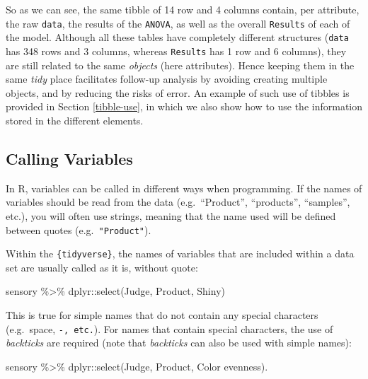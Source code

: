 \documentclass[
]{krantz}
\makeatletter
\newenvironment{Shaded}{\begin{snugshade}}{\end{snugshade}}
\newcommand{\AttributeTok}[1]{\textcolor[rgb]{0.61,0.61,0.61}{#1}}
\newcommand{\FunctionTok}[1]{\textcolor[rgb]{0,0,0}{#1}}
\newcommand{\NormalTok}[1]{#1}
\newcommand{\SpecialCharTok}[1]{\textcolor[rgb]{0,0,0}{#1}}
\newcommand{\StringTok}[1]{\textcolor[rgb]{0.5,0.5,0.5}{#1}}
\newenvironment{kframe}{%
\medskip{}
\setlength{\fboxsep}{.8em}
 \def\at@end@of@kframe{}%
 \ifinner\ifhmode%
  \def\at@end@of@kframe{\end{minipage}}%
  \begin{minipage}{\columnwidth}%
 \fi\fi%
 \def\FrameCommand##1{\hskip\@totalleftmargin \hskip-\fboxsep
 \colorbox{shadecolor}{##1}\hskip-\fboxsep
     \hskip-\linewidth \hskip-\@totalleftmargin \hskip\columnwidth}%
 \MakeFramed {\advance\hsize-\width
   \@totalleftmargin\z@ \linewidth\hsize
   \@setminipage}}%
 {\par\unskip\endMakeFramed%
 \at@end@of@kframe}
\renewenvironment{Shaded}{\begin{kframe}}{\end{kframe}}
\makeatother
\begin{document}
So as we can see, the same tibble of 14 row and 4 columns contain, per attribute, the raw \texttt{data}, the results of the \texttt{ANOVA}, as well as the overall \texttt{Results} of each of the model. Although all these tables have completely different structures (\texttt{data} has 348 rows and 3 columns, whereas \texttt{Results} has 1 row and 6 columns), they are still related to the same \emph{objects} (here attributes). Hence keeping them in the same \emph{tidy} place facilitates follow-up analysis by avoiding creating multiple objects, and by reducing the risks of error. An example of such use of tibbles is provided in Section \ref{tibble-use}, in which we also show how to use the information stored in the different elements.

\hypertarget{calling-variables}{%
\subsection{Calling Variables}\label{calling-variables}}

In R, variables can be called in different ways when programming. If the names of variables should be read from the data (e.g.~``Product'', ``products'', ``samples'', etc.), you will often use strings, meaning that the name used will be defined between quotes (e.g.~\texttt{"Product"}).

Within the \texttt{\{tidyverse\}}, the names of variables that are included within a data set are usually called as it is, without quote:

\begin{Shaded}
\begin{Highlighting}[]
\NormalTok{sensory }\SpecialCharTok{\%\textgreater{}\%} 
\NormalTok{  dplyr}\SpecialCharTok{::}\FunctionTok{select}\NormalTok{(Judge, Product, Shiny)}
\end{Highlighting}
\end{Shaded}

This is true for simple names that do not contain any special characters (e.g.~space, \texttt{-,\ etc.}). For names that contain special characters, the use of \emph{backticks} are required (note that \emph{backticks} can also be used with simple names):

\begin{Shaded}
\begin{Highlighting}[]
\NormalTok{sensory }\SpecialCharTok{\%\textgreater{}\%} 
\NormalTok{  dplyr}\SpecialCharTok{::}\FunctionTok{select}\NormalTok{(}\StringTok{\textasciigrave{}}\AttributeTok{Judge}\StringTok{\textasciigrave{}}\NormalTok{, Product, }\StringTok{\textasciigrave{}}\AttributeTok{Color evenness}\StringTok{\textasciigrave{}}\NormalTok{).}
\end{Highlighting}
\end{Shaded}
\end{document}
